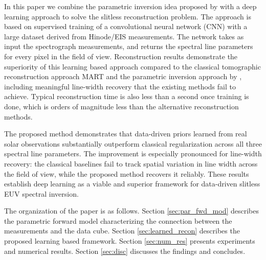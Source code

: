 \documentclass[linenumbers,twocolumn]{aastex7}
\begin{document}
In this paper we combine the parametric inversion idea proposed by
\citet{davila2019slitless} with a deep learning approach to solve the slitless
reconstruction problem. The approach is based on supervised training of a
convolutional neural network (CNN) with a large dataset derived from Hinode/EIS
measurements. The network takes as input the spectrograph measurements, and
returns the spectral line parameters for every pixel in the field of view.
Reconstruction results demonstrate the superiority of this learning based
approach compared to the classical tomographic reconstruction approach MART \citep[as
implemented by][]{parker2022first} and the parametric inversion approach by
\citet{davila2019slitless}, including meaningful line-width recovery that the
existing methods fail to achieve. Typical reconstruction time is also less than a
second once training is done, which is orders of magnitude less than the
alternative reconstruction methods.

The proposed method demonstrates that data-driven priors learned from real solar
observations substantially outperform classical regularization across all three
spectral line parameters. The improvement is especially pronounced for
line-width recovery: the classical baselines fail to track spatial variation in
line width across the field of view, while the proposed method recovers it
reliably. These results establish deep learning as a viable and superior
framework for data-driven slitless EUV spectral inversion.

The organization of the paper is as follows. Section \ref{sec:par_fwd_mod} describes the parametric
forward model characterizing the connection between the measurements and the data
cube. Section \ref{sec:learned_recon} describes the proposed learning based framework. Section \ref{sec:num_res}
presents experiments and numerical results. Section \ref{sec:disc} discusses the
findings and concludes.


\end{document}
